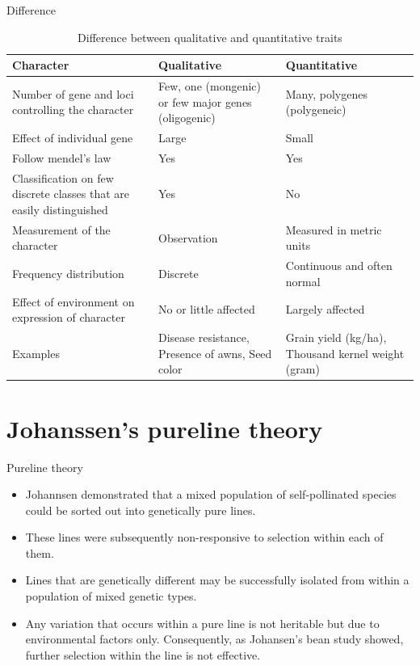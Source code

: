 \documentclass[11pt,dvipsnames,ignorenonframetext,aspectratio=169]{beamer}
\providecommand{\tightlist}{%
  \setlength{\itemsep}{0pt}\setlength{\parskip}{0pt}}
\begin{document}
\begin{frame}{Difference}
\protect\hypertarget{difference}{}
\begin{table}

\caption{\label{tab:quality-quantity-difference}Difference between qualitative and quantitative traits}
\centering
\fontsize{6}{8}\selectfont
\begin{tabular}[t]{>{\raggedright\arraybackslash}p{12em}>{\raggedright\arraybackslash}p{12em}>{\raggedright\arraybackslash}p{12em}}
\toprule
Character & Qualitative & Quantitative\\
\midrule
Number of gene and loci controlling the character & Few, one (mongenic) or few major genes (oligogenic) & Many, polygenes (polygeneic)\\
Effect of individual gene & Large & Small\\
Follow mendel's law & Yes & Yes\\
Classification on few discrete classes that are easily distinguished & Yes & No\\
Measurement of the character & Observation & Measured in metric units\\
\addlinespace
Frequency distribution & Discrete & Continuous and often normal\\
Effect of environment on expression of character & No or little affected & Largely affected\\
Examples & Disease resistance, Presence of awns, Seed color & Grain yield (kg/ha), Thousand kernel weight (gram)\\
\bottomrule
\end{tabular}
\end{table}
\end{frame}

\hypertarget{johanssens-pureline-theory}{%
\section{Johanssen's pureline theory}\label{johanssens-pureline-theory}}

\begin{frame}{Pureline theory}
\protect\hypertarget{pureline-theory}{}
\begin{itemize}
\tightlist
\item
  Johannsen demonstrated that a mixed population of self-pollinated
  species could be sorted out into genetically pure lines.
\item
  These lines were subsequently non-responsive to selection within each
  of them.
\item
  Lines that are genetically different may be successfully isolated from
  within a population of mixed genetic types.
\item
  Any variation that occurs within a pure line is not heritable but due
  to environmental factors only. Consequently, as Johansen's bean study
  showed, further selection within the line is not effective.
\end{itemize}
\end{frame}
\end{document}
